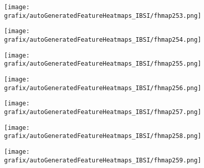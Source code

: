 \begin{subfigure}{\wid\textwidth} 
    \centering 
    \caption{\tiny \sffamily {}} 
    \vspace{\vsp} 
    \texttt{[image: grafix/autoGeneratedFeatureHeatmaps\_IBSI/fhmap253.png]} 
\end{subfigure} 
\hspace{\hsp} 
\begin{subfigure}{\wid\textwidth} 
    \centering 
    \caption{\tiny \sffamily {}} 
    \vspace{\vsp} 
    \texttt{[image: grafix/autoGeneratedFeatureHeatmaps\_IBSI/fhmap254.png]} 
\end{subfigure} 
\hspace{\hsp} 
\begin{subfigure}{\wid\textwidth} 
    \centering 
    \caption{\tiny \sffamily {}} 
    \vspace{\vsp} 
    \texttt{[image: grafix/autoGeneratedFeatureHeatmaps\_IBSI/fhmap255.png]} 
\end{subfigure} 
\hspace{\hsp} 
\begin{subfigure}{\wid\textwidth} 
    \centering 
    \caption{\tiny \sffamily {}} 
    \vspace{\vsp} 
    \texttt{[image: grafix/autoGeneratedFeatureHeatmaps\_IBSI/fhmap256.png]} 
\end{subfigure} 
\hspace{\hsp} 
\begin{subfigure}{\wid\textwidth} 
    \centering 
    \caption{\tiny \sffamily {}} 
    \vspace{\vsp} 
    \texttt{[image: grafix/autoGeneratedFeatureHeatmaps\_IBSI/fhmap257.png]} 
\end{subfigure} 
\hspace{\hsp} 
\begin{subfigure}{\wid\textwidth} 
    \centering 
    \caption{\tiny \sffamily {}} 
    \vspace{\vsp} 
    \texttt{[image: grafix/autoGeneratedFeatureHeatmaps\_IBSI/fhmap258.png]} 
\end{subfigure} 
\hspace{\hsp} 
\begin{subfigure}{\wid\textwidth} 
    \centering 
    \caption{\tiny \sffamily {}} 
    \vspace{\vsp} 
    \texttt{[image: grafix/autoGeneratedFeatureHeatmaps\_IBSI/fhmap259.png]} 
\end{subfigure} 
